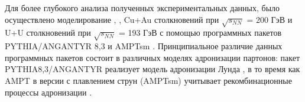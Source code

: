 Для более глубокого анализа полученных экспериментальных данных, было осуществлено моделирование \pal, \heau, Cu+Au столкновений при $\sqrt{s_{NN}}$ = 200 ГэВ и U+U столкновений при $\sqrt{s_{NN}}$ = 193 ГэВ с помощью программных пакетов PYTHIA/ANGANTYR 8,3 \cite{pythia} и AMPTsm \cite{AMPT}.
Принципиальное различие данных программных пакетов состоит в различных моделях адронизации партонов: пакет PYTHIA8,3/ANGANTYR \cite{pythia} реализует модель адронизации Лунда \cite{FragmentationLund}, в то время как AMPT \cite{AMPT} в версии с плавлением струн (AMPTsm) учитывает рекомбинационные процессы адронизации \cite{Recombination1, Recombination2}.

\begin{comment}
	\subsection{PYTHIA8}
	\label{subsect5_pythia}
	PYTHIA 8,3 - программный пакет, основанный на методе Монте-Карло, предназначенный для моделирования ультрорелятивистских столкновений, основанный на теоретических расчетах КХД, а также модели фрагментации Лунда.
	
	Процесс моделирования столкновения в PYTHIA 8,3 состоит из трех основных этапов: первый этап - моделирование жестких процессов, второй этап - моделирование партонных взаимодействий и третий этап - моделирование адронных взаимодействий.
	
	На первом этапе происходит моделирование процесса жесткого рассеяния и рождения короткоживущих резонансов. Жесткие рассеяния частиц моделируются согнласно расчетам  пертурбативной КХД.
	
	На этапе партонных взаимодействий происходит моделирование излучения в начальном и конечном состоянии. Также на данном уровне реализованы многопартонные взаимодействия и происходит обработка нуклонов-спектаторов. На завершающей стадии партонного уровня событие представляет собой реалистичную партонную структуру, включающую струи и  основноое жесткое взаимодействие. 
	
	На завершающем адронном этапе осуществляется объединение партонов в синглетные по цвету состояния. В PYTHIA 8,3 процесс адронизации описывается с помощью КХД струн, фрагментирующимися в адроны. Также на адронном уровне реализуется распад нестабильных адронов и адронное рассеяние. Физические модели адронизации обычно являются непертурбативными, и поэтому требуют моделирования и настройки параметров. Выход на адронном уровне является реалистичным событием. поскольку его можно наблюдать в детекторе.
	

\end{comment}
